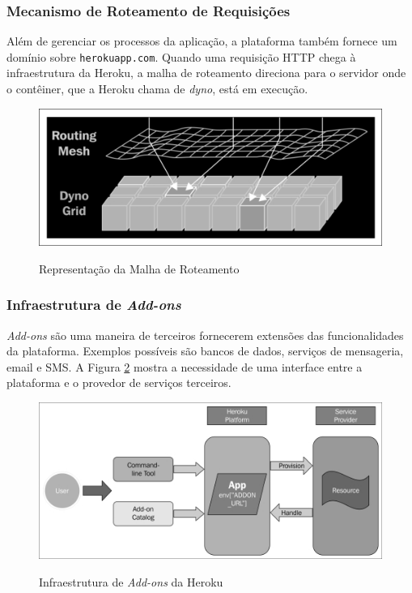 	        \subsubsection{Mecanismo de Roteamento de Requisições}
	            Além de gerenciar os processos da aplicação, a plataforma também fornece um domínio sobre 
	            \texttt{herokuapp.com}. Quando uma requisição HTTP chega à infraestrutura da Heroku, a malha de roteamento direciona para o servidor onde o contêiner, que a Heroku chama de \textit{dyno}, está em execução.\cite{herokucloud}
        	    \begin{figure}[htb]
            	    \centering
            	    \caption{Representação da Malha de Roteamento}
            	    \includegraphics[scale=2.5]{pictures/especificacao-de-projeto/heroku-routing.jpg}
            	    \label{fig:herokurouting}
        	    \end{figure}
	        \subsubsection{Infraestrutura de \textit{Add-ons}}
	            \textit{Add-ons} são uma maneira de terceiros fornecerem extensões das funcionalidades da plataforma. Exemplos possíveis são bancos de dados, serviços de mensageria, email e SMS. A Figura \ref{fig:herokuaddons} mostra a necessidade de uma interface entre a plataforma e o provedor de serviços terceiros. \cite{herokucloud}
	            \begin{figure}[htb]
            	    \centering
            	    \caption{Infraestrutura de \textit{Add-ons} da Heroku}
            	    \includegraphics[scale=2.5]{pictures/especificacao-de-projeto/heroku-addons.jpg}
            	    \label{fig:herokuaddons}
        	    \end{figure}
